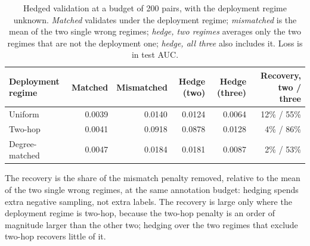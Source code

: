 \begin{table}[htbp]
\centering
\scriptsize
\caption{Hedged validation at a budget of 200 pairs, with the deployment regime unknown. \emph{Matched} validates under the deployment regime; \emph{mismatched} is the mean of the two single wrong regimes; \emph{hedge, two regimes} averages only the two regimes that are not the deployment one; \emph{hedge, all three} also includes it. Loss is in test AUC.}
\label{tab:hedge}
\begin{tabular}{l r r r r r}
\toprule
Deployment regime & Matched & Mismatched & Hedge (two) & Hedge (three) & Recovery, two / three \\
\midrule
Uniform & 0.0039 & 0.0140 & 0.0124 & 0.0064 & 12\% / 55\% \\
Two-hop & 0.0041 & 0.0918 & 0.0878 & 0.0128 & 4\% / 86\% \\
Degree-matched & 0.0047 & 0.0184 & 0.0181 & 0.0087 & 2\% / 53\% \\
\bottomrule
\end{tabular}
\par\vspace{2pt}\begin{minipage}{\linewidth}\footnotesize The recovery is the share of the mismatch penalty removed, relative to the mean of the two single wrong regimes, at the same annotation budget: hedging spends extra negative sampling, not extra labels. The recovery is large only where the deployment regime is two-hop, because the two-hop penalty is an order of magnitude larger than the other two; hedging over the two regimes that exclude two-hop recovers little of it.\end{minipage}
\end{table}
